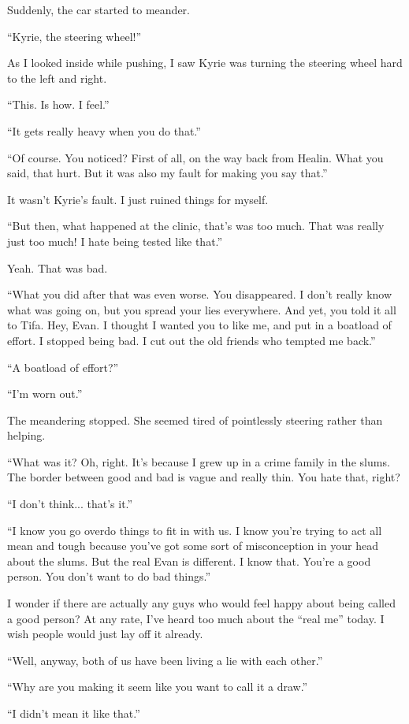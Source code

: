 \documentclass[oneside]{book}
\begin{document}
Suddenly, the car started to meander.

“Kyrie, the steering wheel!”

As I looked inside while pushing, I saw Kyrie was turning the steering wheel hard to the left and right.

“This. Is how. I feel.”

“It gets really heavy when you do that.”

“Of course. You noticed? First of all, on the way back from Healin. What you said, that hurt. But it was also my fault for making you say that.”

It wasn’t Kyrie’s fault. I just ruined things for myself.

“But then, what happened at the clinic, that’s was too much. That was really just too much! I hate being tested like that.”

Yeah. That was bad.

“What you did after that was even worse. You disappeared. I don’t really know what was going on, but you spread your lies everywhere. And yet, you told it all to Tifa. Hey, Evan. I thought I wanted you to like me, and put in a boatload of effort. I stopped being bad. I cut out the old friends who tempted me back.”

“A boatload of effort?”

“I’m worn out.”

The meandering stopped. She seemed tired of pointlessly steering rather than helping.

“What was it? Oh, right. It’s because I grew up in a crime family in the slums. The border between good and bad is vague and really thin. You hate that, right?

“I don’t think... that’s it.”

“I know you go overdo things to fit in with us. I know you’re trying to act all mean and tough because you’ve got some sort of misconception in your head about the slums. But the real Evan is different. I know that. You’re a good person. You don’t want to do bad things.”

I wonder if there are actually any guys who would feel happy about being called a good person? At any rate, I’ve heard too much about the “real me” today. I wish people would just lay off it already.

“Well, anyway, both of us have been living a lie with each other.”

“Why are you making it seem like you want to call it a draw.”

“I didn’t mean it like that.”
\end{document}
